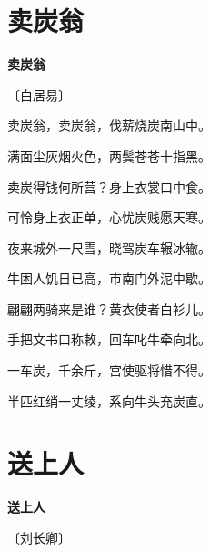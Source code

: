 \documentclass[12pt,UTF-8,openany,fontset=none]{ctexbook}
\begin{document}
\vspace{8pt}
\clearpage

\section{卖炭翁}


\begin{center}
    {\bfseries 卖炭翁}

    \vspace{18pt}

    \begin{large}\xuwen
        〔白居易〕
    \end{large}

\end{center}

    \vspace{18pt}  %

\begin{center}
    \begin{Large}

        卖炭翁，卖炭翁，伐薪烧炭南山中。

        满面尘灰烟火色，两鬓苍苍十指黑。

        卖炭得钱何所营？身上衣裳口中食。

        可怜身上衣正单，心忧炭贱愿天寒。

        夜来城外一尺雪，晓驾炭车辗冰辙。

        牛困人饥日已高，市南门外泥中歇。

        翩翩两骑来是谁？黄衣使者白衫儿。

        手把文书口称敕，回车叱牛牵向北。

        一车炭，千余斤，宫使驱将惜不得。

        半匹红绡一丈绫，系向牛头充炭直。

    \end{Large}

\end{center}

\vspace{8pt}
\clearpage

\section{送上人}


\begin{center}
    {\bfseries 送上人}

    \vspace{18pt}

    \begin{large}\xuwen
        〔刘长卿〕
    \end{large}

\end{center}
\end{document}
